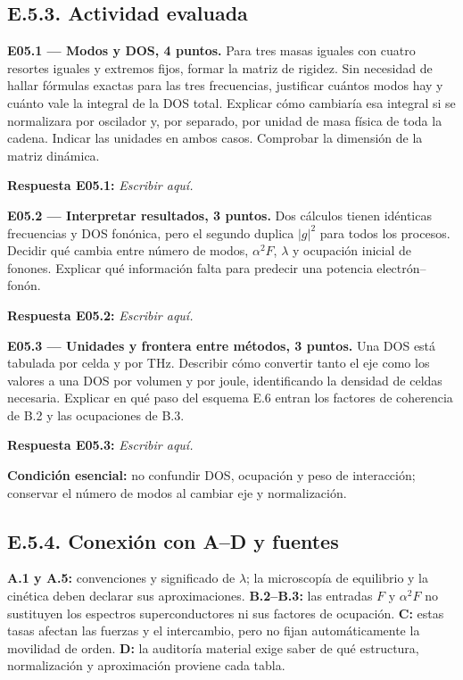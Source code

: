 \documentclass[
  spanish,
  10pt,
  a4paper,
]{article}
\newcounter{none} %
\begin{document}
\subsection{E.5.3. Actividad evaluada}\label{e.5.3.-actividad-evaluada}

\textbf{E05.1 --- Modos y DOS, 4 puntos.} Para tres masas iguales con
cuatro resortes iguales y extremos fijos, formar la matriz de rigidez.
Sin necesidad de hallar fórmulas exactas para las tres frecuencias,
justificar cuántos modos hay y cuánto vale la integral de la DOS total.
Explicar cómo cambiaría esa integral si se normalizara por oscilador y,
por separado, por unidad de masa física de toda la cadena. Indicar las
unidades en ambos casos. Comprobar la dimensión de la matriz dinámica.

\textbf{Respuesta E05.1:} \emph{Escribir aquí.}

\textbf{E05.2 --- Interpretar resultados, 3 puntos.} Dos cálculos tienen
idénticas frecuencias y DOS fonónica, pero el segundo duplica \(|g|^2\)
para todos los procesos. Decidir qué cambia entre número de modos,
\(\alpha^2F\), \(\lambda\) y ocupación inicial de fonones. Explicar qué
información falta para predecir una potencia electrón--fonón.

\textbf{Respuesta E05.2:} \emph{Escribir aquí.}

\textbf{E05.3 --- Unidades y frontera entre métodos, 3 puntos.} Una DOS
está tabulada por celda y por THz. Describir cómo convertir tanto el eje
como los valores a una DOS por volumen y por joule, identificando la
densidad de celdas necesaria. Explicar en qué paso del esquema E.6
entran los factores de coherencia de B.2 y las ocupaciones de B.3.

\textbf{Respuesta E05.3:} \emph{Escribir aquí.}

\textbf{Condición esencial:} no confundir DOS, ocupación y peso de
interacción; conservar el número de modos al cambiar eje y
normalización.

\subsection{E.5.4. Conexión con A--D y
fuentes}\label{e.5.4.-conexiuxf3n-con-ad-y-fuentes}

\textbf{A.1 y A.5:} convenciones y significado de \(\lambda\); la
microscopía de equilibrio y la cinética deben declarar sus
aproximaciones. \textbf{B.2--B.3:} las entradas \(F\) y \(\alpha^2F\) no
sustituyen los espectros superconductores ni sus factores de ocupación.
\textbf{C:} estas tasas afectan las fuerzas y el intercambio, pero no
fijan automáticamente la movilidad de orden. \textbf{D:} la auditoría
material exige saber de qué estructura, normalización y aproximación
proviene cada tabla.
\end{document}
